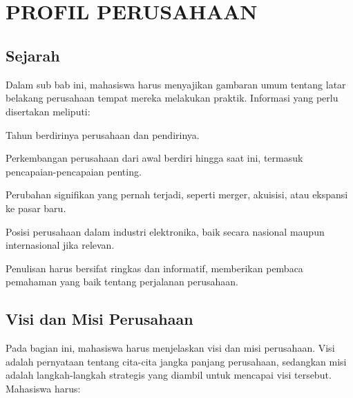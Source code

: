 
\chapter[PROFIL PERUSAHAAN]{\\ PROFIL PERUSAHAAN}

\section{Sejarah \perusahaan}
Dalam sub bab ini, mahasiswa harus menyajikan gambaran umum tentang latar belakang perusahaan tempat mereka melakukan praktik. Informasi yang perlu disertakan meliputi:

\begin{packed_enum}
    \item Tahun berdirinya perusahaan dan pendirinya.
    \item Perkembangan perusahaan dari awal berdiri hingga saat ini, termasuk pencapaian-pencapaian penting.
    \item Perubahan signifikan yang pernah terjadi, seperti merger, akuisisi, atau ekspansi ke pasar baru.
    \item Posisi perusahaan dalam industri elektronika, baik secara nasional maupun internasional jika relevan.
\end{packed_enum}

Penulisan harus bersifat ringkas dan informatif, memberikan pembaca pemahaman yang baik tentang perjalanan perusahaan.

\section{Visi dan Misi Perusahaan}
Pada bagian ini, mahasiswa harus menjelaskan visi dan misi perusahaan. Visi adalah pernyataan tentang cita-cita jangka panjang perusahaan, sedangkan misi adalah langkah-langkah strategis yang diambil untuk mencapai visi tersebut. Mahasiswa harus:

